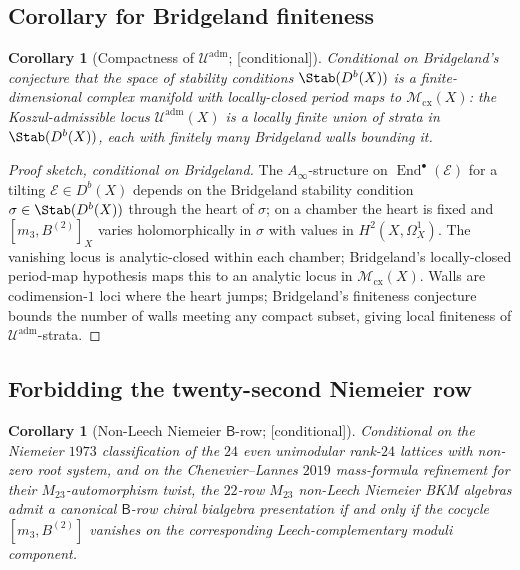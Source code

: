 \documentclass[11pt,reqno]{amsart}
\theoremstyle{plain}
\newtheorem{corollary}[theorem]{Corollary}
\theoremstyle{definition}
\theoremstyle{remark}
\providecommand{\ClaimStatusConditional}{\textnormal{[conditional]}}
\DeclareMathOperator{\End}{End}
\newcommand{\cM}{\mathcal{M}}
\newcommand{\cU}{\mathcal{U}}
\newcommand{\cE}{\mathcal{E}}
\newcommand{\sfB}{\mathsf{B}}
\begin{document}
\subsection{Corollary for Bridgeland finiteness}

\begin{corollary}[Compactness of $\cU^{\mathrm{adm}}$; \ClaimStatusConditional]
\label{cor:bridgeland}
Conditional on Bridgeland's conjecture that the space of stability conditions $\Stab(D^b(X))$ is a finite-dimensional complex manifold with locally-closed period maps to $\cM_{\mathrm{cx}}(X)$: the Koszul-admissible locus $\cU^{\mathrm{adm}}(X)$ is a locally finite union of strata in $\Stab(D^b(X))$, each with finitely many Bridgeland walls bounding it.
\end{corollary}

\begin{proof}[Proof sketch, conditional on Bridgeland]
The $A_\infty$-structure on $\End^\bullet(\cE)$ for a tilting $\cE \in D^b(X)$ depends on the Bridgeland stability condition $\sigma \in \Stab(D^b(X))$ through the heart of $\sigma$; on a chamber the heart is fixed and $[m_3, B^{(2)}]_X$ varies holomorphically in $\sigma$ with values in $H^2(X, \Omega^1_X)$. The vanishing locus is analytic-closed within each chamber; Bridgeland's locally-closed period-map hypothesis maps this to an analytic locus in $\cM_{\mathrm{cx}}(X)$. Walls are codimension-$1$ loci where the heart jumps; Bridgeland's finiteness conjecture bounds the number of walls meeting any compact subset, giving local finiteness of $\cU^{\mathrm{adm}}$-strata.
\end{proof}

\subsection{Forbidding the twenty-second Niemeier row}

\begin{corollary}[Non-Leech Niemeier $\sfB$-row; \ClaimStatusConditional]
\label{cor:m23}
Conditional on the Niemeier $1973$ classification of the $24$ even unimodular rank-$24$ lattices with non-zero root system, and on the Chenevier--Lannes $2019$ mass-formula refinement for their $M_{23}$-automorphism twist, the $22$-row $M_{23}$ non-Leech Niemeier BKM algebras admit a canonical $\sfB$-row chiral bialgebra presentation if and only if the cocycle $[m_3, B^{(2)}]$ vanishes on the corresponding Leech-complementary moduli component.
\end{corollary}
\end{document}
